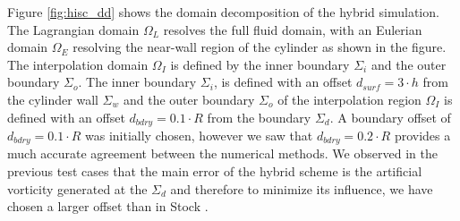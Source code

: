 
Figure \ref{fig:hisc_dd} shows the domain decomposition of the hybrid simulation. The Lagrangian domain $\Omega_L$ resolves the full fluid domain, with an Eulerian domain $\Omega_E$ resolving the near-wall region of the cylinder as shown in the figure. The interpolation domain $\Omega_I$ is defined by the inner boundary $\Sigma_i$ and the outer boundary $\Sigma_o$. The inner boundary $\Sigma_i$, is defined with an offset $d_{surf}=3\cdot{h}$ from the cylinder wall $\Sigma_{w}$ and the  outer boundary $\Sigma_{o}$ of the interpolation region $\Omega_{I}$ is defined with an offset $d_{bdry} = 0.1\cdot{R}$ from the boundary $\Sigma_d$. A boundary offset of $d_{bdry} = 0.1\cdot{R}$ was initially chosen, however we saw that $d_{bdry} = 0.2\cdot{R}$ provides a much accurate agreement between the numerical methods. We observed in the previous test cases that the main error of the hybrid scheme is the artificial vorticity generated at the $\Sigma_d$ and therefore to minimize its influence, we have chosen a larger offset than in Stock \cite{Stock2010a}.

